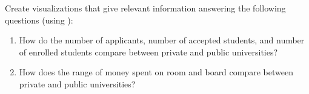 \begin{problem}
Create visualizations that give relevant information answering the following questions (using ):
\begin{enumerate}
\item How do the number of applicants, number of accepted students, and number of enrolled students compare between private and public universities?

\item How does the range of money spent on room and board compare between private and public universities?
\end{enumerate}
\end{problem}

